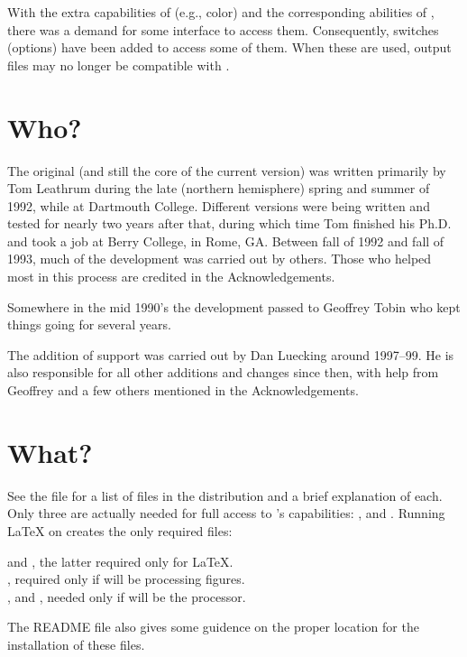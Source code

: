 \documentclass[letterpaper]{article}
\begin{document}
With the extra capabilities of \PS{} (e.g., color) and the corresponding
abilities of \MP{}, there was a demand for some \mfp{} interface to
access them. Consequently, switches (options) have been added to access
some of them. When these are used, output files may no longer be
compatible with \MF{}.


\section{Who?}\label{author}

The original \mfp{} (and still the core of the current version) was written
primarily by Tom Leathrum during the late (northern hemisphere) spring
and summer of 1992, while at Dartmouth College. Different versions were
being written and tested for nearly two years after that, during which
time Tom finished his Ph.D. and took a job at Berry College, in Rome,
GA.  Between fall of 1992 and fall of 1993, much of the development was
carried out by others.  Those who helped most in this process are
credited in the Acknowledgements.

Somewhere in the mid 1990's the development passed to Geoffrey Tobin who
kept things going for several years.

The addition of \MP{} support was carried out by Dan Luecking around
1997--99. He is also responsible for all other additions and changes
since then, with help from Geoffrey and a few others mentioned in the
Acknowledgements.


\section{What?}\label{manifest}

See the  file for a list of files in the distribution and a
brief explanation of each. Only three are actually needed for full access
to \mfp{}'s capabilities: ,  and
. Running \LaTeX{} on
 creates the only required files:
\begin{display}
   and , the latter required only for
    \LaTeX{}.\\
  , required only if \MF{} will be processing
    figures.\\
  ,  and , needed
    only if \MP{} will be the processor.
\end{display}
The README file also gives some guidence on the proper location for the
installation of these files.
\end{document}
